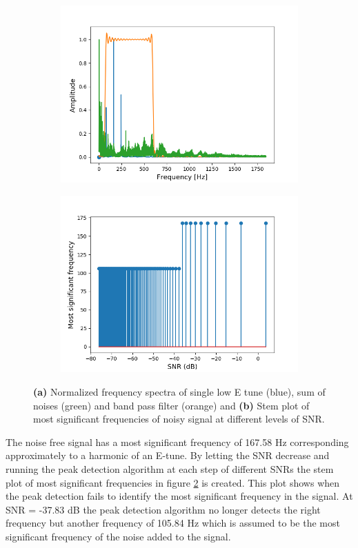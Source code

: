 \begin{figure}[H]
\begin{subfigure}{0.49\textwidth}
\centering
\includegraphics[width=\textwidth]{figures/SNR/single_spectrum.png}
\caption{}
\label{fig:single_spectrum}
\end{subfigure}
\begin{subfigure}{0.49\textwidth}
\centering
\includegraphics[width=\textwidth]{figures/SNR/single_stem.png}
\caption{}
\label{fig:single_stem}
\end{subfigure}
\caption{\textbf{(a)} Normalized frequency spectra of single low E tune (blue), sum of noises (green) and band pass filter (orange) and \textbf{(b)} Stem plot of most significant frequencies of noisy signal at different levels of SNR.}
\label{fig:single_noise}
\end{figure}
The noise free signal has a most significant frequency of 167.58 Hz corresponding approximately to a harmonic of an E-tune. By letting the SNR decrease and running the peak detection algorithm at each step of different SNRs the stem plot of most significant frequencies in figure \ref{fig:single_stem} is created. This plot shows when the peak detection fails to identify the most significant frequency in the signal. At SNR = -37.83 dB the peak detection algorithm no longer detects the right frequency but another frequency of 105.84 Hz which is assumed to be the most significant frequency of the noise added to the signal.
